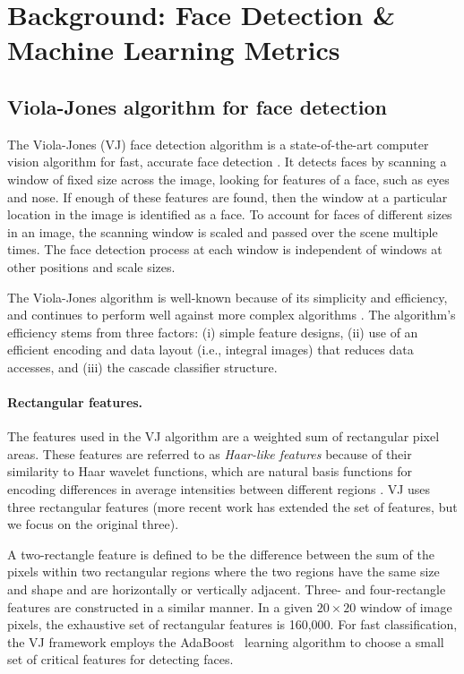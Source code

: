 \section{Background: Face Detection \& Machine Learning Metrics}
\label{sec:backvj}

\subsection{Viola-Jones algorithm for face detection}

The Viola-Jones (VJ) face detection algorithm is a state-of-the-art computer vision algorithm for fast, accurate face detection \cite{vj_journal}. It detects faces by scanning a window of fixed size across the image, looking for features of a face, such as eyes and nose. If enough of these features are found, then the window at a particular location in the image is identified as a face. To account for faces of different sizes in an image, the scanning window is scaled and passed over the scene multiple times. The face detection process at each window is independent of windows at other positions and scale sizes.

The Viola-Jones algorithm is well-known because of its simplicity and efficiency,
and continues to perform well against more complex algorithms \cite{mathias_fd}.
The algorithm's efficiency stems from three factors: (i) simple feature
designs, (ii) use of an efficient encoding and data layout (i.e., integral images) that reduces data accesses, and (iii) the cascade classifier structure.

\paragraph{Rectangular features.} The features used in the VJ algorithm
are a weighted sum of rectangular pixel areas. These features are referred to
as \textit{Haar-like features} because of their similarity to Haar wavelet
functions, which are natural basis functions for encoding differences in average intensities
between different regions \cite{haar_basis}.
VJ uses three rectangular features (more
recent work has extended the set of features, but we focus on the original three).

A two-rectangle feature is defined to be the difference between the sum of the
pixels within two rectangular regions where the two regions have the same size
and shape and are horizontally or vertically adjacent. Three- and four-rectangle
features are constructed in a similar manner. In a given $20\times 20$ window of image
pixels, the exhaustive set of rectangular features is 160,000. For fast
classification, the VJ framework employs the AdaBoost~\cite{adaboost} learning algorithm to choose a
small set of critical features for detecting faces.

